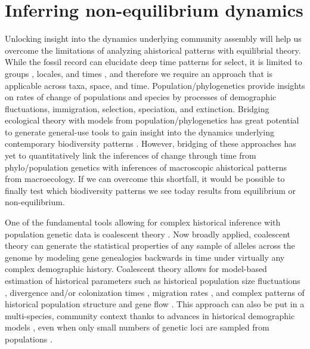 \documentclass[12pt]{article}
\begin{document}
\section{Inferring non-equilibrium dynamics}

Unlocking insight into the dynamics underlying community assembly will
help us overcome the limitations of analyzing ahistorical patterns
with equilibrial theory. While the fossil record can elucidate deep
time patterns for select,  it is limited to  groups \citep{Alroy2008-no}, locales, and times \citep{Harnik2011-qe}, and therefore we require an approach that is
applicable across taxa, space, and
time. Population/phylogenetics provide insights on rates of change of
populations and species by processes of demographic fluctuations,
immigration, selection, speciation, and extinction. Bridging
ecological theory with models from population/phylogenetics has great
potential to generate general-use tools to gain insight into the dynamics
underlying contemporary biodiversity patterns \citep{Webb2002-yr,
  Emerson2002-mw, Lavergne2010-ts, Li2016-ns, McGaughran2015-sy,
  Laroche2015-qo, Vanoverbeke2015-ym, Vellend2005-qd,
  Papadopoulou2011-bd,Dexter2012-rn}. However, bridging of these approaches has
yet to quantitatively link the inferences of change through time from
phylo/population genetics with inferences of macroscopic ahistorical
patterns from macroecology.  If we can overcome this shortfall, it would be possible to
finally test which biodiversity patterns we see today results from
equilibrium or non-equilibrium.

One of the fundamental tools allowing for complex historical inference
with population genetic data is coalescent theory
\citep{Hudson1983-hx, Tajima1983-me, Kingman1982-uf, Kingman1982-ie,
  Rosenberg2002-ag}.  Now broadly applied, coalescent theory can
generate the statistical properties of any sample of alleles across
the genome by modeling gene genealogies backwards in time under
virtually any complex demographic history.  Coalescent theory allows for model-based
estimation of historical parameters such as historical population size
fluctuations \citep{Kuhner1998-dp, Slatkin1991-ec}, divergence and/or
colonization times \citep{Charlesworth2010-hn, Edwards2000-cs},
migration rates \citep{Wakeley2008-se}, and complex patterns of
historical population structure \citep{Prado-Martinez2013-hv,
  Bahlo2000-cx} and gene flow \citep{Beerli2001-mt,Hey2004-xe}. This
approach can also be put in a multi-species, community context thanks
to advances in historical demographic models \citep{Xue2015-el,
  Hickerson2006-uf, Carstens2016-mc, Chan2014-nq, Satler2016-lb}, even
when only small numbers of genetic loci are sampled from populations
\citep{Drummond2005-zh}.
\end{document}
